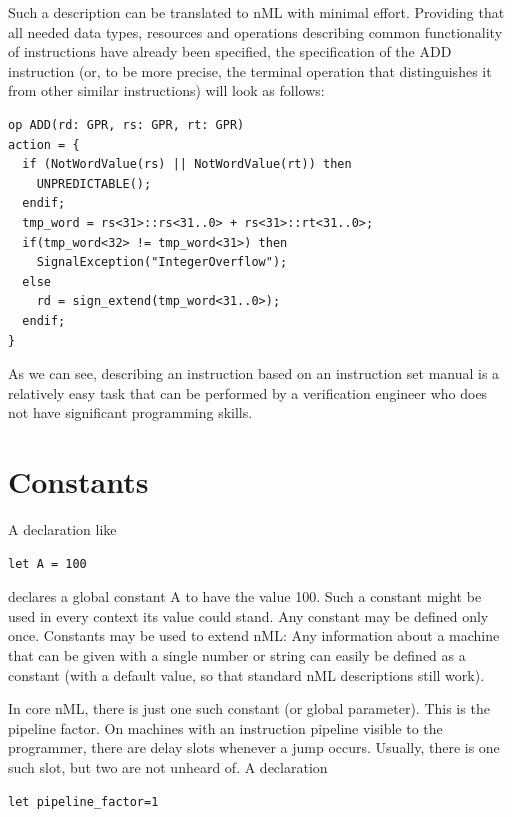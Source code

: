 \documentclass[oneside,final,14pt]{extreport}
\begin{document}
Such a description can be translated to nML with minimal effort. Providing that
all needed data types, resources and operations describing common functionality
of instructions have already been specified, the specification of the ADD
instruction (or, to be more precise, the terminal operation that distinguishes 
it from other similar instructions) will look as follows:

\begin{lstlisting}
op ADD(rd: GPR, rs: GPR, rt: GPR)
action = {
  if (NotWordValue(rs) || NotWordValue(rt)) then
    UNPREDICTABLE();
  endif;
  tmp_word = rs<31>::rs<31..0> + rs<31>::rt<31..0>;
  if(tmp_word<32> != tmp_word<31>) then
    SignalException("IntegerOverflow");
  else
    rd = sign_extend(tmp_word<31..0>);
  endif;
}
\end{lstlisting}

As we can see, describing an instruction based on an instruction set manual is
a relatively easy task that can be performed by a verification engineer who
does not have significant programming skills.


\section{Constants}

A declaration like

\begin{lstlisting}
let A = 100
\end{lstlisting}

declares a global constant A to have the value 100. Such a constant might be used in every context
its value could stand. Any constant may be defined only once. Constants may be used to extend nML:
Any information about a machine that can be given with a single number or string can easily be
defined as a constant (with a default value, so that standard nML descriptions still work).

In core nML, there is just one such constant (or global parameter).
This is the pipeline factor. On machines with an instruction pipeline visible to the programmer,
there are delay slots whenever a jump occurs. Usually, there is one such slot, but two are not
unheard of. A declaration

\begin{lstlisting}
let pipeline_factor=1
\end{lstlisting}
\end{document}
